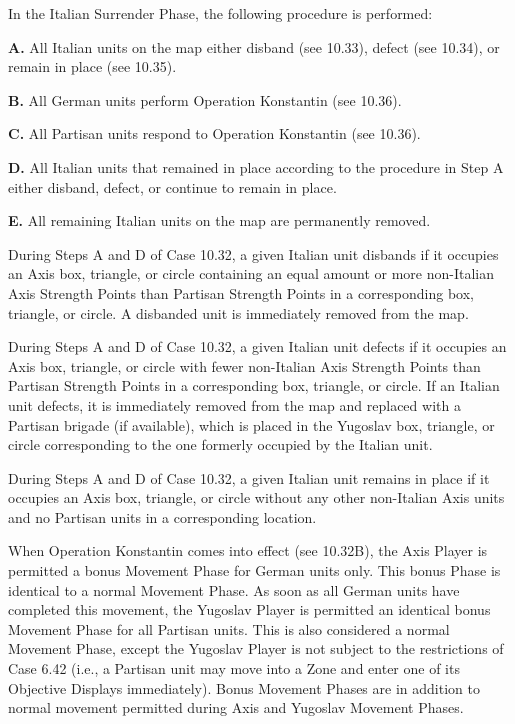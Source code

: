  In the Italian Surrender Phase, the following procedure is performed:

\textbf{A.} All Italian units on the map either disband (see 10.33), defect (see 10.34), or remain in place (see 10.35).

\textbf{B.} All German units perform Operation Konstantin (see 10.36).

\textbf{C.} All Partisan units respond to Operation Konstantin (see 10.36).

\textbf{D.} All Italian units that remained in place according to the procedure in Step A either disband, defect, or continue to remain in place.

\textbf{E.} All remaining Italian units on the map are permanently removed.

 During Steps A and D of Case 10.32, a given Italian unit disbands if it occupies an Axis box, triangle, or circle containing an equal amount or more non-Italian Axis Strength Points than Partisan Strength Points in a corresponding box, triangle, or circle. A disbanded unit is immediately removed from the map.

 During Steps A and D of Case 10.32, a given Italian unit defects if
it occupies an Axis box, triangle, or circle with fewer non-Italian Axis Strength
Points than Partisan Strength Points in a corresponding box, triangle, or circle.
If an Italian unit defects, it is immediately removed from the map and replaced
with a Partisan brigade (if available), which is placed in the Yugoslav box,
triangle, or circle corresponding to the one formerly occupied by the Italian
unit.

 During Steps A and D of Case 10.32, a given Italian unit remains in place if it occupies an Axis box, triangle, or circle without any other non-Italian Axis units and no Partisan units in a corresponding location.

 When Operation Konstantin comes into effect (see 10.32B), the Axis Player is permitted a bonus Movement Phase for German units only. This bonus Phase is identical to a normal Movement Phase. As soon as all German units have completed this movement, the Yugoslav Player is permitted an identical bonus Movement Phase for all Partisan units. This is also considered a normal Movement Phase, except the Yugoslav Player is not subject to the restrictions of Case 6.42 (i.e., a Partisan unit may move into a Zone and enter one of its Objective Displays immediately). Bonus Movement Phases are in addition to normal movement permitted during Axis and Yugoslav Movement Phases.
